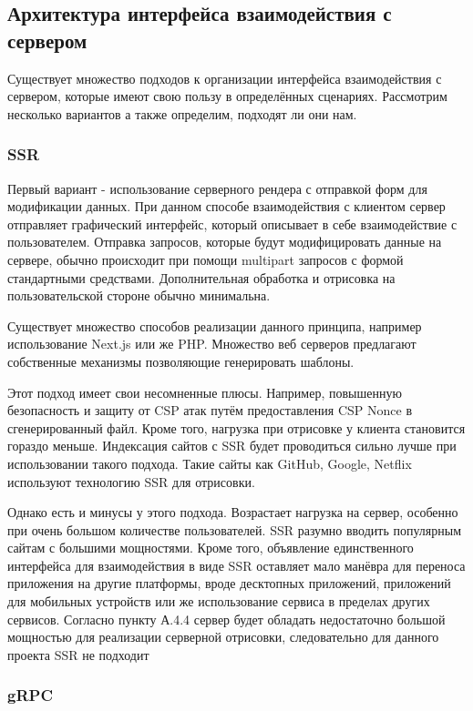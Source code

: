 \documentclass[14pt]{extarticle}
\begin{document}
\subsection{Архитектура интерфейса взаимодействия с сервером}

Существует множество подходов к организации интерфейса взаимодействия с сервером, которые имеют свою пользу в определённых
сценариях. Рассмотрим несколько вариантов а также определим, подходят ли они нам.

\subsubsection{SSR}

Первый вариант - использование серверного рендера с отправкой форм для модификации данных. При данном способе
взаимодействия с клиентом сервер отправляет графический интерфейс, который описывает в себе взаимодействие с пользователем.
Отправка запросов, которые будут модифицировать данные на сервере, обычно происходит при помощи multipart запросов
с формой стандартными средствами. Дополнительная обработка и отрисовка на пользовательской стороне обычно минимальна.

Существует множество способов реализации данного принципа, например использование Next.js или же PHP. Множество
веб серверов предлагают собственные механизмы позволяющие генерировать шаблоны.

Этот подход имеет свои несомненные плюсы. Например, повышенную безопасность и защиту от CSP атак путём предоставления
CSP Nonce в сгенерированный файл. Кроме того, нагрузка при отрисовке у клиента становится гораздо меньше. 
Индексация сайтов с SSR будет проводиться сильно лучше при использовании такого подхода. Такие сайты как
GitHub, Google, Netflix используют технологию SSR для отрисовки.

Однако есть и минусы у этого подхода. Возрастает нагрузка на сервер, особенно при очень большом количестве пользователей.
SSR разумно вводить популярным сайтам с большими мощностями. Кроме того, объявление единственного интерфейса для взаимодействия
в виде SSR оставляет мало манёвра для переноса приложения на другие платформы, вроде десктопных приложений, приложений
для мобильных устройств или же использование сервиса в пределах других сервисов. Согласно пункту А.4.4 сервер
будет обладать недостаточно большой мощностью для реализации серверной отрисовки, следовательно для данного проекта SSR
не подходит

\subsubsection{gRPC}
\end{document}
